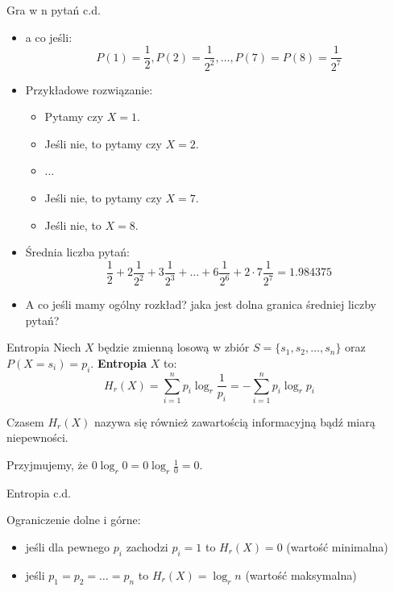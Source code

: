 \documentclass{beamer}
\begin{document}
\begin{frame}{Gra w n pytań c.d.}

\begin{itemize}
  \item a co jeśli:
  $$
  P(1) = \frac{1}{2}, P(2) = \frac{1}{2^2}, \ldots, P(7) = P(8) = \frac{1}{2^7}
  $$
  \pause
  \item Przykładowe rozwiązanie:
  \begin{itemize}
    \item Pytamy czy $X=1$.
    \item Jeśli nie, to pytamy czy $X=2$.
    \item $\ldots$
    \item Jeśli nie, to pytamy czy $X=7$.
    \item Jeśli nie, to $X=8$.
  \end{itemize}
  \item Średnia liczba pytań:
  $$\frac{1}{2} + 2 \frac{1}{2^2} + 3 \frac{1}{2^3} + \ldots + 6 \frac{1}{2^6} +2 \cdot 7 \frac{1}{2^7} = 1.984375$$
  \item A co jeśli mamy ogólny rozkład? jaka jest dolna granica średniej liczby pytań?
\end{itemize}
\end{frame}


\begin{frame}{Entropia}
Niech $X$ będzie zmienną losową w zbiór $S = \{s_1, s_2, \ldots, s_n\}$
oraz $P(X=s_i) = p_i$. \textbf{Entropia} $X$ to:
$$
H_r(X) = \sum_{i=1}^{n} p_i \log_{r}{\frac{1}{p_i}} = - \sum_{i=1}^{n} p_i \log_{r}{p_i}
$$

Czasem $H_r(X)$ nazywa się również zawartością informacyjną bądź miarą niepewności.

Przyjmujemy, że $0 \log_r{0} = 0 \log_r{\frac{1}{0}} = 0$.

\end{frame}


\begin{frame}{Entropia c.d.}

Ograniczenie dolne i górne:
\begin{itemize}
  \item jeśli dla pewnego $p_i$ zachodzi $p_i = 1$ to $H_r(X) = 0$ (wartość minimalna)
  \item jeśli $p_1 = p_2 = \ldots = p_n$ to $H_r(X) = \log_r{n}$ (wartość maksymalna)
\end{itemize}

\end{frame}
\end{document}
